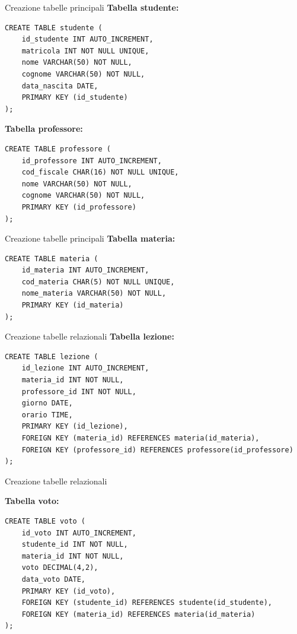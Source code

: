 \documentclass{beamer}
\begin{document}
\begin{frame}[fragile]{Creazione tabelle principali}
\small
\textbf{Tabella studente:}
\begin{verbatim}
CREATE TABLE studente (
    id_studente INT AUTO_INCREMENT,
    matricola INT NOT NULL UNIQUE,
    nome VARCHAR(50) NOT NULL,
    cognome VARCHAR(50) NOT NULL,
    data_nascita DATE,
    PRIMARY KEY (id_studente)
);
\end{verbatim}

\textbf{Tabella professore:}
\begin{verbatim}
CREATE TABLE professore (
    id_professore INT AUTO_INCREMENT,
    cod_fiscale CHAR(16) NOT NULL UNIQUE,
    nome VARCHAR(50) NOT NULL,
    cognome VARCHAR(50) NOT NULL,
    PRIMARY KEY (id_professore)
);
\end{verbatim}
\end{frame}
\begin{frame}[fragile]{Creazione tabelle principali}
\small
\textbf{Tabella materia:}
\begin{verbatim}
CREATE TABLE materia (
    id_materia INT AUTO_INCREMENT,
    cod_materia CHAR(5) NOT NULL UNIQUE,
    nome_materia VARCHAR(50) NOT NULL,
    PRIMARY KEY (id_materia)
);
\end{verbatim}
\end{frame}

\begin{frame}[fragile]{Creazione tabelle relazionali}
\small
\textbf{Tabella lezione:}
\begin{verbatim}
CREATE TABLE lezione (
    id_lezione INT AUTO_INCREMENT,
    materia_id INT NOT NULL,
    professore_id INT NOT NULL,
    giorno DATE,
    orario TIME,
    PRIMARY KEY (id_lezione),
    FOREIGN KEY (materia_id) REFERENCES materia(id_materia),
    FOREIGN KEY (professore_id) REFERENCES professore(id_professore)
);
\end{verbatim}
\end{frame}
\begin{frame}[fragile]{Creazione tabelle relazionali}
\small

\textbf{Tabella voto:}
\begin{verbatim}
CREATE TABLE voto (
    id_voto INT AUTO_INCREMENT,
    studente_id INT NOT NULL,
    materia_id INT NOT NULL,
    voto DECIMAL(4,2),
    data_voto DATE,
    PRIMARY KEY (id_voto),
    FOREIGN KEY (studente_id) REFERENCES studente(id_studente),
    FOREIGN KEY (materia_id) REFERENCES materia(id_materia)
);
\end{verbatim}
\end{frame} 
\end{document}
